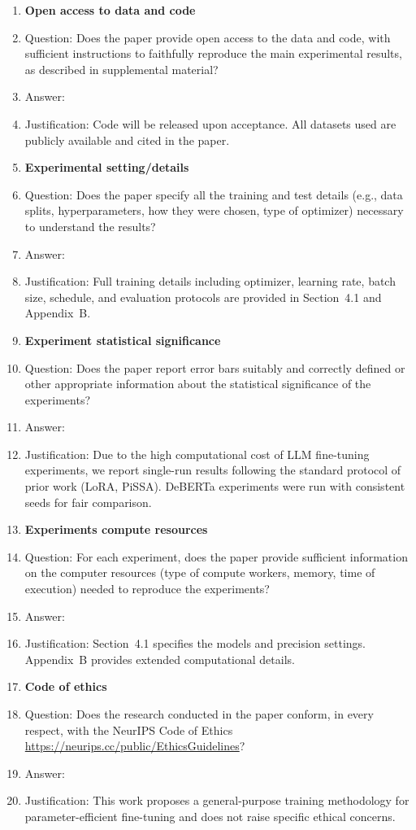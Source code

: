 \begin{enumerate}
\item {\bf Open access to data and code}
    \item[] Question: Does the paper provide open access to the data and code, with sufficient instructions to faithfully reproduce the main experimental results, as described in supplemental material?
    \item[] Answer: \answerNo{}
    \item[] Justification: Code will be released upon acceptance. All datasets used are publicly available and cited in the paper.


\item {\bf Experimental setting/details}
    \item[] Question: Does the paper specify all the training and test details (e.g., data splits, hyperparameters, how they were chosen, type of optimizer) necessary to understand the results?
    \item[] Answer: \answerYes{}
    \item[] Justification: Full training details including optimizer, learning rate, batch size, schedule, and evaluation protocols are provided in Section~4.1 and Appendix~B.

\item {\bf Experiment statistical significance}
    \item[] Question: Does the paper report error bars suitably and correctly defined or other appropriate information about the statistical significance of the experiments?
    \item[] Answer: \answerNo{}
    \item[] Justification: Due to the high computational cost of LLM fine-tuning experiments, we report single-run results following the standard protocol of prior work (LoRA, PiSSA). DeBERTa experiments were run with consistent seeds for fair comparison.

\item {\bf Experiments compute resources}
    \item[] Question: For each experiment, does the paper provide sufficient information on the computer resources (type of compute workers, memory, time of execution) needed to reproduce the experiments?
    \item[] Answer: \answerYes{}
    \item[] Justification: Section~4.1 specifies the models and precision settings. Appendix~B provides extended computational details.

\item {\bf Code of ethics}
    \item[] Question: Does the research conducted in the paper conform, in every respect, with the NeurIPS Code of Ethics \url{https://neurips.cc/public/EthicsGuidelines}?
    \item[] Answer: \answerYes{}
    \item[] Justification: This work proposes a general-purpose training methodology for parameter-efficient fine-tuning and does not raise specific ethical concerns.



\end{enumerate}

